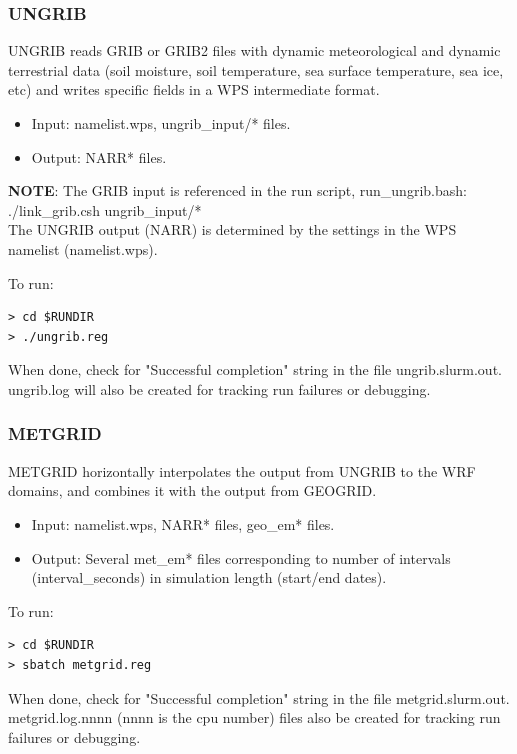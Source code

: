\begin{frame}[fragile]\frametitle{UNGRIB}

\footnotesize{
UNGRIB reads GRIB or GRIB2 files with dynamic meteorological and dynamic terrestrial data (soil moisture, soil temperature, sea surface temperature, sea ice, etc) and writes specific fields in a WPS intermediate format.
\begin{itemize}
\item Input: namelist.wps, ungrib\_input/* files.
\item Output: NARR* files.
\end{itemize}}
\scriptsize{\textbf{NOTE}: The GRIB input is referenced in the run script, run\_ungrib.bash:\\
      ./link\_grib.csh ungrib\_input/*\\
The UNGRIB output (NARR) is determined by the settings in the WPS namelist (namelist.wps). \\
}
\hrulefill\par
\footnotesize{To run:}
\begin{lstlisting}
> cd $RUNDIR
> ./ungrib.reg
\end{lstlisting}
When done, check for  "Successful completion"  string in the file ungrib.slurm.out. ungrib.log will also be created for tracking run failures or debugging.

\end{frame}

\begin{frame}[fragile]\frametitle{METGRID}

\footnotesize{
METGRID horizontally interpolates the output from UNGRIB to the WRF domains, and combines it with the
output from GEOGRID.
\begin{itemize}
\item Input: namelist.wps, NARR* files, geo\_em* files.
\item Output: Several met\_em* files corresponding to number of intervals (interval\_seconds) in simulation length (start/end dates).
\end{itemize}
}    
\hrulefill\par
\footnotesize{To run:}
\begin{lstlisting}
> cd $RUNDIR
> sbatch metgrid.reg
\end{lstlisting}
When done, check for  "Successful completion" string in the file metgrid.slurm.out. metgrid.log.nnnn (nnnn is the cpu number) files also be created for tracking run failures or debugging.


\end{frame}

